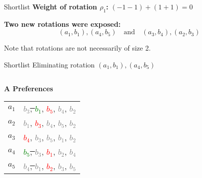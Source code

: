 \documentclass[aspectratio=169,xcolor=dvipsnames]{beamer}
\begin{document}
\begin{frame}{Shortlist}
\vspace{1em}
\pause
\textbf{Weight of rotation \( \rho_1 \):} \( (-1-1) + (1+1) = 0 \)

\pause
\textbf{Two new rotations were exposed:} 
\[
(a_1, b_1), (a_4, b_5) \quad \text{and} \quad (a_3, b_4), (a_2, b_3)
\]

\pause
Note that rotations are not necessarily of size 2.
\end{frame}


\begin{frame}{Shortlist}
Eliminating rotation \( (a_1, b_1), (a_4, b_5) \)

\vspace{1em}
\begin{columns}[t]
  \begin{column}{0.45\textwidth}
    \textbf{A Preferences}\\[6pt]
    \begin{tabular}{r@{: }l}
      $a_1$ & \sout{\textcolor{gray}{$b_3$}, \textcolor{green}{$b_1$}}, \textcolor{red}{$b_5$}, \sout{\textcolor{gray}{$b_4$}}, \sout{\textcolor{gray}{$b_2$}} \\
      $a_2$ & \sout{\textcolor{gray}{$b_1$}}, \textcolor{red}{$b_3$}, \textcolor{gray}{$b_4$}, \sout{\textcolor{gray}{$b_5$}}, \sout{\textcolor{gray}{$b_2$}} \\
      $a_3$ & \textcolor{red}{$b_4$}, \textcolor{gray}{$b_3$}, \sout{\textcolor{gray}{$b_5$}}, \sout{\textcolor{gray}{$b_1$}}, \textcolor{gray}{$b_2$} \\
      $a_4$ & \sout{\textcolor{green}{$b_5$}, \textcolor{gray}{$b_3$}}, \textcolor{red}{$b_1$}, \sout{\textcolor{gray}{$b_2$}}, \textcolor{gray}{$b_4$} \\
      $a_5$ & \sout{\textcolor{gray}{$b_4$}, \textcolor{gray}{$b_1$}}, \textcolor{red}{$b_2$}, \textcolor{gray}{$b_3$}, \sout{\textcolor{gray}{$b_5$}} \\
    \end{tabular}
  \end{column}


\end{columns}
\end{frame}
\end{document}
